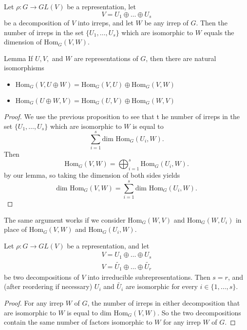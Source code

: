 \begin{frame}
\begin{proposition}
Let $\rho \colon G \to GL(V)$ be a representation, let \[ V = U_1 \oplus \ldots \oplus U_s \] be a decomposition of $V$ into irreps, and let $W$ be any irrep of $G$.  Then the number of irreps in the set  $ \{ U_1, \ldots, U_s \}$ which are isomorphic to $W$ equals the dimension of $\text{Hom}_G(V,W)$.
\end{proposition}
\begin{block}{Lemma}
If  $U, V,$ and $W$ are representations of $G$, then there are natural isomorphisms
\begin{itemize}
\item $\text{Hom}_G(V, U \oplus W) = \text{Hom}_G(V,U) \oplus \text{Hom}_G(V,W)$
\item $\text{Hom}_G(U \oplus W, V) = \text{Hom}_G(U, V) \oplus \text{Hom}_G(W ,V)$
\end{itemize}
\end{block}
\end{frame}

\begin{frame}
\begin{proof}
We use the previous proposition to see that t	he number of irreps in the set  $ \{ U_1, \ldots, U_s \}$ which are isomorphic to $W$ is equal to \[ \sum_{i=1}^s \text{dim Hom}_G(U_i,W). \]
Then \[ \text{Hom}_G(V,W) = \bigoplus_{i=1}^s \text{Hom}_G(U_i, W) .\]
by our lemma, so taking the dimension of both sides yields \[  \text{dim Hom}_G(V,W) = \sum_{i=1}^s \text{dim Hom}_G(U_i, W). \]
\end{proof}
\end{frame}
\begin{note}
The same argument works if we consider $\text{Hom}_G(W,V)$ and $\text{Hom}_G(W,U_i)$ in place of $\text{Hom}_G(V,W)$ and $\text{Hom}_G(U_i,W)$.
\end{note}

\begin{frame}
\begin{theorem}
Let $\rho \colon G \to GL(V)$ be a representation, and let
\begin{align*}
V = U_1 \oplus \ldots \oplus U_s \\
V = \widetilde{U_1} \oplus \ldots \oplus \widetilde{U_r}
\end{align*}
be two decompositions of $V$ into irreducible subrepresentations.  Then $s = r$, and (after reordering if necessary) $U_i$ and $\widetilde{U_i}$ are isomorphic for every $i \in \{1, \ldots, s\}$.
\end{theorem}
\begin{proof}
For any irrep $W$ of $G$, the number of irreps in either decomposition that are isomorphic to $W$ is equal to $\text{dim Hom}_G(V,W)$.  So the two decompositions contain the same number of factors isomorphic to $W$ for any irrep $W$ of $G$.
\end{proof}
\end{frame}

